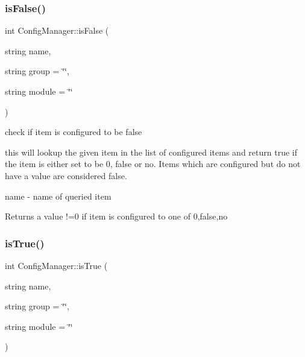 \subsubsection{\texorpdfstring{is\+False()}{isFalse()}}
{\footnotesize\ttfamily int Config\+Manager\+::is\+False (\begin{DoxyParamCaption}\item[{string}]{name,  }\item[{string}]{group = {\ttfamily \char`\"{}\char`\"{}},  }\item[{string}]{module = {\ttfamily \char`\"{}\char`\"{}} }\end{DoxyParamCaption})}



check if item is configured to be false 

this will lookup the given item in the list of configured items and return true if the item is either set to be \textquotesingle{}0\textquotesingle{}, \textquotesingle{}false\textquotesingle{} or \textquotesingle{}no\textquotesingle{}. Items which are configured but do not have a value are considered false.

\begin{DoxyItemize}
\item {\ttfamily name} -\/ name of queried item \begin{DoxyReturn}{Returns}
a value !=0 if item is configured to one of \textquotesingle{}0\textquotesingle{},\textquotesingle{}false\textquotesingle{},\textquotesingle{}no\textquotesingle{} 
\end{DoxyReturn}
\end{DoxyItemize}
\mbox{\label{classConfigManager_af39ad88f6a49f537c1660aa186f4f4eb}} 
\subsubsection{\texorpdfstring{is\+True()}{isTrue()}}
{\footnotesize\ttfamily int Config\+Manager\+::is\+True (\begin{DoxyParamCaption}\item[{string}]{name,  }\item[{string}]{group = {\ttfamily \char`\"{}\char`\"{}},  }\item[{string}]{module = {\ttfamily \char`\"{}\char`\"{}} }\end{DoxyParamCaption})}



